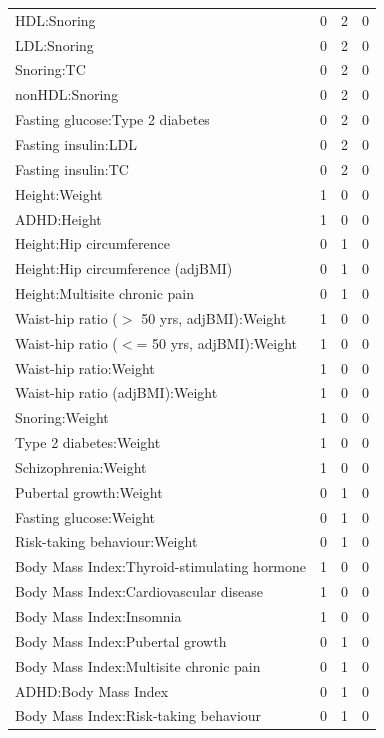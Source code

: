 \begin{table}[ht]
\begin{tabular}{lrrr}
  HDL:Snoring &   0 &   2 &   0 \\ 
  LDL:Snoring &   0 &   2 &   0 \\ 
  Snoring:TC &   0 &   2 &   0 \\ 
  nonHDL:Snoring &   0 &   2 &   0 \\ 
  Fasting glucose:Type 2 diabetes &   0 &   2 &   0 \\ 
  Fasting insulin:LDL &   0 &   2 &   0 \\ 
  Fasting insulin:TC &   0 &   2 &   0 \\ 
  Height:Weight &   1 &   0 &   0 \\ 
  ADHD:Height &   1 &   0 &   0 \\ 
  Height:Hip circumference &   0 &   1 &   0 \\ 
  Height:Hip circumference (adjBMI) &   0 &   1 &   0 \\ 
  Height:Multisite chronic pain &   0 &   1 &   0 \\ 
  Waist-hip ratio ($>$ 50 yrs, adjBMI):Weight &   1 &   0 &   0 \\ 
  Waist-hip ratio ($<$= 50 yrs, adjBMI):Weight &   1 &   0 &   0 \\ 
  Waist-hip ratio:Weight &   1 &   0 &   0 \\ 
  Waist-hip ratio (adjBMI):Weight &   1 &   0 &   0 \\ 
  Snoring:Weight &   1 &   0 &   0 \\ 
  Type 2 diabetes:Weight &   1 &   0 &   0 \\ 
  Schizophrenia:Weight &   1 &   0 &   0 \\ 
  Pubertal growth:Weight &   0 &   1 &   0 \\ 
  Fasting glucose:Weight &   0 &   1 &   0 \\ 
  Risk-taking behaviour:Weight &   0 &   1 &   0 \\ 
  Body Mass Index:Thyroid-stimulating hormone &   1 &   0 &   0 \\ 
  Body Mass Index:Cardiovascular disease &   1 &   0 &   0 \\ 
  Body Mass Index:Insomnia &   1 &   0 &   0 \\ 
  Body Mass Index:Pubertal growth &   0 &   1 &   0 \\ 
  Body Mass Index:Multisite chronic pain &   0 &   1 &   0 \\ 
  ADHD:Body Mass Index &   0 &   1 &   0 \\ 
  Body Mass Index:Risk-taking behaviour &   0 &   1 &   0 \\ 

\end{tabular}
\end{table}
